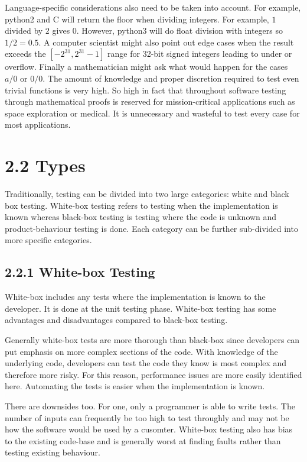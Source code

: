 \documentclass[12pt]{report}
\begin{document}
\par\noindent
Language-specific considerations also need to be taken into account. For example, python2 and C will return the floor when dividing integers. For example, $1$ divided by $2$ gives $0$. However, python3 will do float division with integers so $1 / 2 = 0.5$. A computer scientist might also point out edge cases when the result exceeds the $[-2^{31}, 2^{31}-1]$ range for 32-bit signed integers leading to under or overflow. Finally a mathematician might ask what would happen for the cases $a/0$ or $0/0$. The amount of knowledge and proper discretion required to test even trivial functions is very high. So high in fact that throughout software testing through mathematical proofs is reserved for mission-critical applications such as space exploration or medical. It is unnecessary and wasteful to test every case for most applications.

\section*{2.2 Types}

Traditionally, testing can be divided into two large categories: white and black box testing. White-box testing refers to testing when the implementation is known whereas black-box testing is testing where the code is unknown and product-behaviour testing is done. Each category can be further sub-divided into more specific categories.

\subsection*{2.2.1 White-box Testing}
\par\noindent
White-box includes any tests where the implementation is known to the developer. It is done at the unit testing phase. White-box testing has some advantages and disadvantages compared to black-box testing. 

\par\noindent
Generally white-box tests are more thorough than black-box since developers can put emphasis on more complex sections of the code. With knowledge of the underlying code, developers can test the code they know is most complex and therefore more risky. For this reason, performance issues are more easily identified here. Automating the tests is easier when the implementation is known.

\par\noindent
There are downsides too. For one, only a programmer is able to write tests. The number of inputs can frequently be too high to test throughly and may not be how the software would be used by a cusomter. White-box testing also has bias to the existing code-base and is generally worst at finding faults rather than testing existing behaviour.
\end{document}
